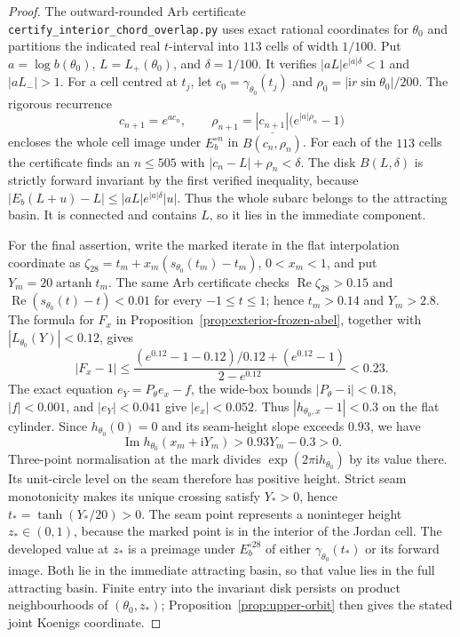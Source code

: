 \documentclass[11pt]{amsart}
\theoremstyle{definition}
\newcommand{\ii}{\mathrm{i}}
\begin{document}
\begin{proof}
The outward-rounded Arb certificate
\texttt{certify\_interior\_chord\_overlap.py} uses exact rational
coordinates for $\theta_0$ and partitions the indicated real
$t$-interval into $113$ cells of width $1/100$.  Put
$a=\log b(\theta_0)$, $L=L_+(\theta_0)$, and $\delta=1/100$.
It verifies $|aL|e^{|a|\delta}<1$ and $|aL_-|>1$.
For a cell centred at $t_j$, let
$c_0=\gamma_{\theta_0}(t_j)$ and
$\rho_0=|\ii r\sin\theta_0|/200$.
The rigorous recurrence
\[
 c_{n+1}=e^{a c_n},\qquad
 \rho_{n+1}=|c_{n+1}|\bigl(e^{|a|\rho_n}-1\bigr)
\]
encloses the whole cell image under $E_b^{\circ n}$ in
$\overline{B(c_n,\rho_n)}$.  For each of the $113$ cells the
certificate finds an $n\le505$ with
$|c_n-L|+\rho_n<\delta$.
The disk $B(L,\delta)$ is strictly forward invariant by the
first verified inequality, because
$|E_b(L+u)-L|\le|aL|e^{|a|\delta}|u|$.
Thus the whole subarc belongs to the attracting basin.
It is connected and contains $L$, so it lies in the immediate
component.

For the final assertion, write the marked iterate in the flat
interpolation coordinate as
$\zeta_{28}=t_m+x_m(s_{\theta_0}(t_m)-t_m)$,
$0<x_m<1$, and put $Y_m=20\operatorname{artanh}t_m$.
The same Arb certificate checks
$\operatorname{Re}\zeta_{28}>0.15$ and
$\operatorname{Re}(s_{\theta_0}(t)-t)<0.01$ for every
$-1\le t\le1$; hence $t_m>0.14$ and $Y_m>2.8$.
The formula for $F_x$ in
Proposition~\ref{prop:exterior-frozen-abel}, together with
$|L_{\theta_0}(Y)|<0.12$, gives
\[
 |F_x-1|\le
 \frac{(e^{0.12}-1-0.12)/0.12+(e^{0.12}-1)}{2-e^{0.12}}
 <0.23.
\]
The exact equation $e_Y=P_\theta e_x-f$, the wide-box bounds
$|P_\theta-\ii|<0.18$, $|f|<0.001$, and
$|e_Y|<0.041$ give $|e_x|<0.052$.  Thus
$|h_{\theta_0,x}-1|<0.3$ on the flat cylinder.
Since $h_{\theta_0}(0)=0$ and its seam-height slope exceeds
$0.93$, we have
\[
 \operatorname{Im}h_{\theta_0}(x_m+\ii Y_m)
 >0.93Y_m-0.3>0.
\]
Three-point normalisation at the mark divides
$\exp(2\pi\ii h_{\theta_0})$ by its value there.
Its unit-circle level on the seam therefore has positive height.
Strict seam monotonicity makes its unique crossing satisfy
$Y_*>0$, hence $t_*=\tanh(Y_*/20)>0$.
The seam point represents a noninteger height $z_*\in(0,1)$,
because the marked point is in the interior of the Jordan cell.
The developed value at $z_*$ is a preimage under
$E_b^{\circ28}$ of either $\gamma_{\theta_0}(t_*)$ or its
forward image.  Both lie in the immediate attracting basin, so
that value lies in the full attracting basin.  Finite entry into
the invariant disk persists on product neighbourhoods of
$(\theta_0,z_*)$; Proposition~\ref{prop:upper-orbit} then gives
the stated joint Koenigs coordinate.
\end{proof}
\end{document}
